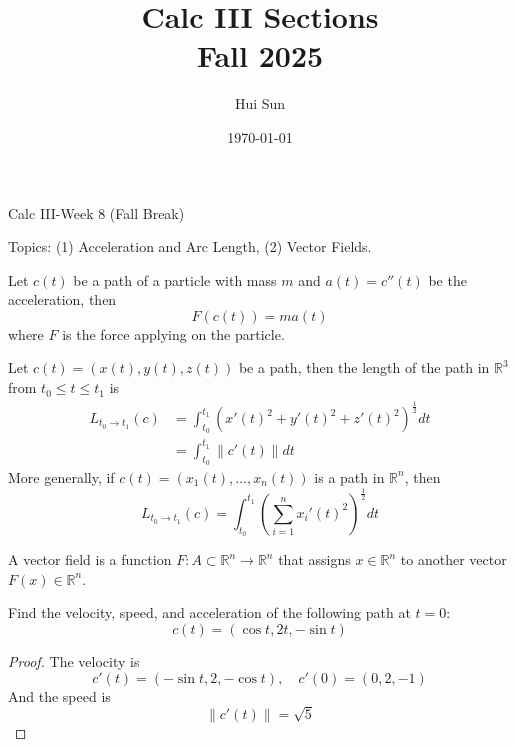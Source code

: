 \documentclass[openany]{book}
\title{Calc III Sections
\\ 
\vspace{0.4cm}
\large Fall 2025}
\date{\today}
\author{Hui Sun}
\newcommand{\R}{\mathbb{R}}
\begin{document}
\maketitle

\newpage


\begin{center}
    \Large Calc III-Week 8 (Fall Break)
\end{center}

\renewcommand\thesection{\arabic{section}}

\noindent
Topics: (1) Acceleration and Arc Length, (2) Vector Fields.

\begin{prop}
    Let $c(t)$ be a path of a particle with mass $m$ and $a(t)=c''(t)$ be the acceleration, then 
    \begin{equation*}
        F(c(t))=ma(t)
    \end{equation*}
    where $F$ is the force applying on the particle.
\end{prop}


\begin{defn}
    Let $c(t)=(x(t), y(t), z(t))$ be a path, then the length of the path in $\R^3$ from $t_0\leq t\leq t_1$ is 
    \begin{align*}
        L_{t_0\to t_1}(c)&=\int_{t_0}^{t_1}\left(x'(t)^2+y'(t)^2+z'(t)^2\right)^\frac{1}{2}dt\\
        &=\int_{t_0}^{t_1}\|c'(t)\|dt
    \end{align*}
    More generally, if $c(t)=(x_1(t), \dots, x_n(t))$ is a path in $\R^n$, then 
    \begin{equation*}
        L_{t_0\to t_1}(c)=\int_{t_0}^{t_1}\left(\sum_{i=1}^nx_i'(t)^2\right)^\frac{1}{2}dt
    \end{equation*}
\end{defn}


\begin{defn}
    A vector field is a function $F:A\subset\R^n\to\R^n$ that assigns $x\in\R^n$ to another vector $F(x)\in\R^n$.
\end{defn}







\begin{prob}
    Find the velocity, speed, and acceleration of the following path at $t=0$:
    \begin{equation*}
        c(t)=(\cos t, 2t, -\sin t)
    \end{equation*}
\end{prob}
\begin{proof}
    The velocity is 
    \begin{equation*}
        c'(t)=(-\sin t, 2, -\cos t), \quad c'(0)=(0,2,-1)
    \end{equation*}
    And the speed is 
    \begin{equation*}
        \|c'(t)\|=\sqrt{5}
    \end{equation*}
\end{proof}
\end{document}
